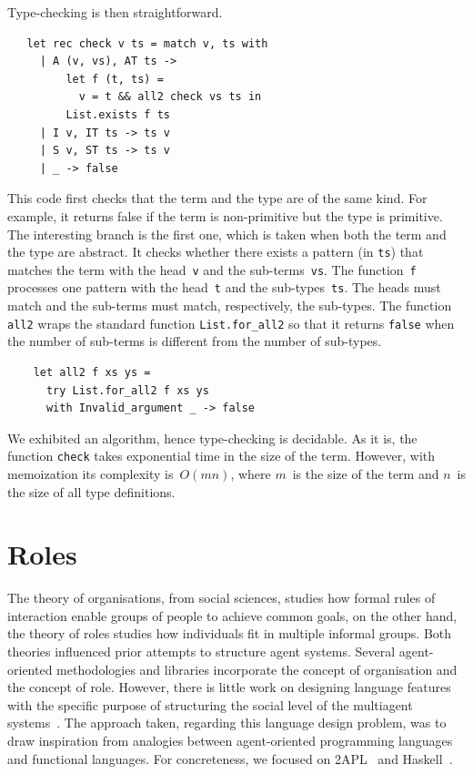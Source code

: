 \documentclass[a4paper,12pt,oneside,fleqn]{book} %
\newcommand{\rg}[1]{\marginpar{\tiny\raggedright\textcolor{blue}{\bf rg:} #1}}
\renewcommand{\rg}{}
\begin{document}
Type-checking is then straightforward.
\begin{verbatim}
   let rec check v ts = match v, ts with
     | A (v, vs), AT ts ->
         let f (t, ts) =
           v = t && all2 check vs ts in
         List.exists f ts
     | I v, IT ts -> ts v
     | S v, ST ts -> ts v
     | _ -> false
\end{verbatim}
This code first checks that the term and the type are of the same kind. For
example, it returns false if the term is non-primitive but the type is
primitive. The interesting branch is the first one, which is taken when
both the term and the type are abstract. It checks whether there exists a
pattern (in \verb|ts|) that matches the term with the head~\verb|v| and the
sub-terms~\verb|vs|. The function~\verb|f| processes one pattern with the
head~\verb|t| and the sub-types~\verb|ts|. The heads must match and the
sub-terms must match, respectively, the sub-types. The function \verb|all2|
wraps the standard function \verb|List.for_all2| so that it returns
\verb|false| when the number of sub-terms is different from the number of
sub-types.
\begin{verbatim}
    let all2 f xs ys =
      try List.for_all2 f xs ys
      with Invalid_argument _ -> false
\end{verbatim}

We exhibited an algorithm, hence type-checking is decidable. As it is, the
function \verb|check| takes exponential time in the size of the term.
However, with memoization its complexity is~$O(mn)$, where $m$~is the
size of the term and $n$~is the size of all type definitions.

\section{Roles}\label{sec:roles} %
The theory of organisations, from social sciences, studies how formal rules
of interaction enable groups of people to achieve common goals, on the
other hand, the theory of roles studies how individuals fit in multiple
informal groups. Both theories influenced prior attempts to structure agent
systems. Several agent-oriented methodologies and libraries incorporate the
concept of organisation and the concept of role.  However, there is little
work on designing language features with the specific purpose of
structuring the social level of the multiagent
systems~\cite{collier2005,DBLP:journals/entcs/BaldoniBT06,DBLP:conf/oopsla/RicciS11}.
The approach taken, regarding this language design problem, was to draw
inspiration from analogies between agent-oriented programming languages and
functional languages. For concreteness, we focused on
2APL~\cite{DBLP:journals/aamas/Dastani08} and Haskell~\cite{web:haskell}.
\end{document}
